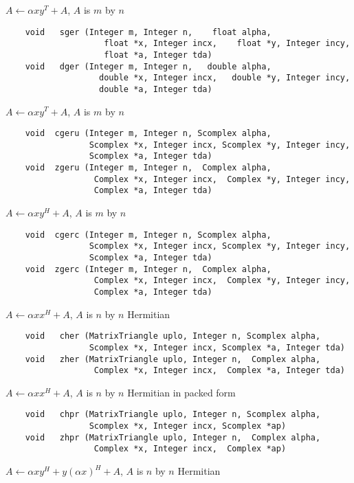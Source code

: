 \normalsize
$A \leftarrow \alpha xy^T + A$, $A$ is $m$ by $n$
\footnotesize
\begin{verbatim}
    void   sger (Integer m, Integer n,    float alpha,
                    float *x, Integer incx,    float *y, Integer incy,
                    float *a, Integer tda)
    void   dger (Integer m, Integer n,   double alpha,
                   double *x, Integer incx,   double *y, Integer incy,
                   double *a, Integer tda) 
\end{verbatim}
\newpage
\normalsize
\noindent
$A \leftarrow \alpha xy^T + A$, $A$ is $m$ by $n$
\footnotesize
\begin{verbatim}
    void  cgeru (Integer m, Integer n, Scomplex alpha,
                 Scomplex *x, Integer incx, Scomplex *y, Integer incy,
                 Scomplex *a, Integer tda)
    void  zgeru (Integer m, Integer n,  Complex alpha,
                  Complex *x, Integer incx,  Complex *y, Integer incy,
                  Complex *a, Integer tda)
\end{verbatim}
\normalsize
$A \leftarrow \alpha xy^H + A$, $A$ is $m$ by $n$
\footnotesize
\begin{verbatim}
    void  cgerc (Integer m, Integer n, Scomplex alpha,
                 Scomplex *x, Integer incx, Scomplex *y, Integer incy,
                 Scomplex *a, Integer tda)
    void  zgerc (Integer m, Integer n,  Complex alpha,
                  Complex *x, Integer incx,  Complex *y, Integer incy,
                  Complex *a, Integer tda)
\end{verbatim}
\normalsize
$A \leftarrow \alpha xx^H + A$, $A$ is $n$ by $n$ Hermitian
\footnotesize
\begin{verbatim}
    void   cher (MatrixTriangle uplo, Integer n, Scomplex alpha,
                 Scomplex *x, Integer incx, Scomplex *a, Integer tda)
    void   zher (MatrixTriangle uplo, Integer n,  Complex alpha,
                  Complex *x, Integer incx,  Complex *a, Integer tda)
\end{verbatim}
\normalsize
$A \leftarrow \alpha xx^H + A$, $A$ is $n$ by $n$ Hermitian in
packed form
\footnotesize
\begin{verbatim}
    void   chpr (MatrixTriangle uplo, Integer n, Scomplex alpha,
                 Scomplex *x, Integer incx, Scomplex *ap)
    void   zhpr (MatrixTriangle uplo, Integer n,  Complex alpha,
                  Complex *x, Integer incx,  Complex *ap)
\end{verbatim}
\normalsize
$A \leftarrow \alpha xy^H + y(\alpha x)^H + A$,
$A$ is $n$ by $n$ Hermitian
